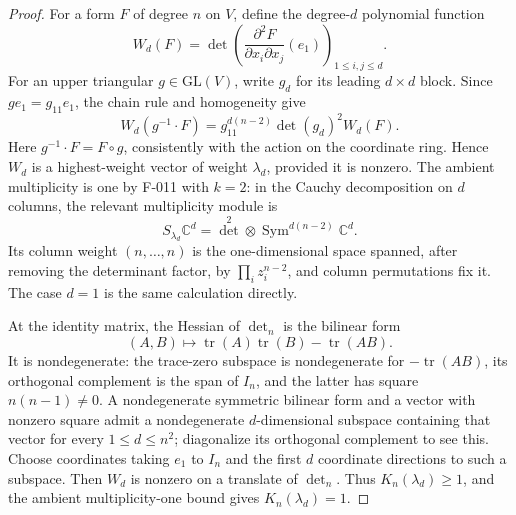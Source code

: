 \begin{proof}
For a form $F$ of degree $n$ on $V$, define the degree-$d$
polynomial function
\[
 W_d(F)=\det\left(\frac{\partial^2F}{\partial x_i\partial x_j}
                                  (e_1)\right)_{1\leq i,j\leq d}.
\]
For an upper triangular $g\in\mathrm{GL}(V)$, write $g_d$ for
its leading $d\times d$ block. Since $ge_1=g_{11}e_1$, the chain
rule and homogeneity give
\[
 W_d(g^{-1}\cdot F)
       =g_{11}^{d(n-2)}\det(g_d)^2 W_d(F).
\]
Here $g^{-1}\cdot F=F\circ g$, consistently with the action on
the coordinate ring. Hence $W_d$ is a highest-weight vector of
weight $\lambda_d$, provided it is nonzero. The ambient
multiplicity is one by F-011 with $k=2$: in the Cauchy
decomposition on $d$ columns, the relevant multiplicity module is
\[
 S_{\lambda_d}\mathbb C^d
       =\det^2\otimes\operatorname{Sym}^{d(n-2)}\mathbb C^d.
\]
Its column weight $(n,\ldots,n)$ is the one-dimensional space
spanned, after removing the determinant factor, by
$\prod_i z_i^{n-2}$, and column permutations fix it. The case
$d=1$ is the same calculation directly.

At the identity matrix, the Hessian of $\det_n$ is the bilinear form
\[
               (A,B)\longmapsto\operatorname{tr}(A)\operatorname{tr}(B)
                                      -\operatorname{tr}(AB).
\]
It is nondegenerate: the trace-zero subspace is nondegenerate for
$-\operatorname{tr}(AB)$, its orthogonal complement is the span
of $I_n$, and the latter has square $n(n-1)\ne0$.
A nondegenerate symmetric bilinear form and a vector with nonzero
square admit a nondegenerate $d$-dimensional subspace containing
that vector for every $1\leq d\leq n^2$; diagonalize its
orthogonal complement to see this. Choose coordinates taking
$e_1$ to $I_n$ and the first $d$ coordinate directions to such
a subspace. Then $W_d$ is nonzero on a translate of $\det_n$.
Thus $K_n(\lambda_d)\geq1$, and the ambient multiplicity-one
bound gives $K_n(\lambda_d)=1$.


\end{proof}
